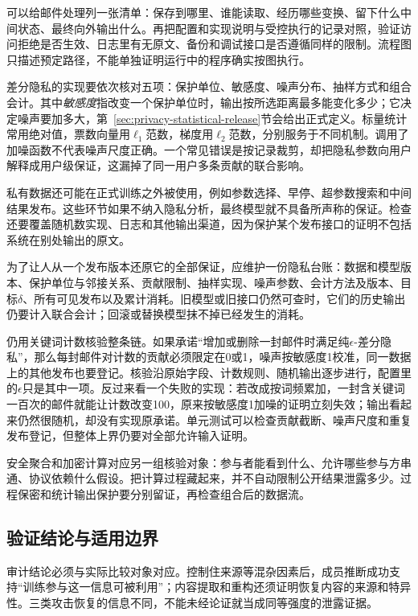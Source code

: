 可以给邮件处理列一张清单：保存到哪里、谁能读取、经历哪些变换、留下什么中间状态、最终向外输出什么。再把配置和实现说明与受控执行的记录对照，验证访问拒绝是否生效、日志里有无原文、备份和调试接口是否遵循同样的限制。流程图只描述预定路径，不能单独证明运行中的程序确实按图执行。

差分隐私的实现要依次核对五项：保护单位、敏感度、噪声分布、抽样方式和组合会计。其中\emph{敏感度}指改变一个保护单位时，输出按所选距离最多能变化多少；它决定噪声要加多大，第~\ref{sec:privacy-statistical-release}节会给出正式定义。标量统计常用绝对值，票数向量用$\ell_1$范数，梯度用$\ell_2$范数，分别服务于不同机制。调用了加噪函数不代表噪声尺度正确。一个常见错误是按记录裁剪，却把隐私参数向用户解释成用户级保证，这漏掉了同一用户多条贡献的联合影响。

私有数据还可能在正式训练之外被使用，例如参数选择、早停、超参数搜索和中间结果发布。这些环节如果不纳入隐私分析，最终模型就不具备所声称的保证。检查还要覆盖随机数实现、日志和其他输出渠道，因为保护某个发布接口的证明不包括系统在别处输出的原文。

为了让人从一个发布版本还原它的全部保证，应维护一份隐私台账：数据和模型版本、保护单位与邻接关系、贡献限制、抽样实现、噪声参数、会计方法及版本、目标$\delta$、所有可见发布以及累计消耗。旧模型或旧接口仍然可查时，它们的历史输出仍要计入联合会计；回滚或替换模型抹不掉已经发生的消耗。

仍用关键词计数核验整条链。如果承诺“增加或删除一封邮件时满足纯$\epsilon$-差分隐私”，那么每封邮件对计数的贡献必须限定在0或1，噪声按敏感度1校准，同一数据上的其他发布也要登记。核验沿原始字段、计数规则、随机输出逐步进行，配置里的$\epsilon$只是其中一项。反过来看一个失败的实现：若改成按词频累加，一封含关键词一百次的邮件就能让计数改变100，原来按敏感度1加噪的证明立刻失效；输出看起来仍然很随机，却没有实现原承诺。单元测试可以检查贡献截断、噪声尺度和重复发布登记，但整体上界仍要对全部允许输入证明。

安全聚合和加密计算对应另一组核验对象：参与者能看到什么、允许哪些参与方串通、协议依赖什么假设。把计算过程藏起来，并不自动限制公开结果泄露多少。过程保密和统计输出保护要分别留证，再检查组合后的数据流。

\subsection{验证结论与适用边界}
\label{sec:privacy-verification-evidence}

审计结论必须与实际比较对象对应。控制住来源等混杂因素后，成员推断成功支持“训练参与这一信息可被利用”；内容提取和重构还须证明恢复内容的来源和特异性。三类攻击恢复的信息不同，不能未经论证就当成同等强度的泄露证据。

